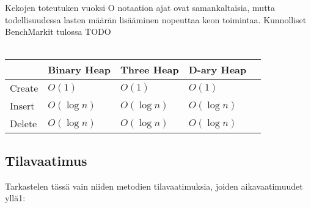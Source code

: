 \documentclass[a4paper,12pt]{article}
\begin{document}
Kekojen toteutuken vuoksi O notaation ajat ovat samankaltaisia, mutta todellisuudessa lasten määrän lisääminen nopeuttaa keon toimintaa. Kunnolliset BenchMarkit tulossa TODO\\\\
\begin{tabular}{|l|l|l|l|l|}
\hline
&Binary Heap & Three Heap & D-ary Heap \\\hline
Create & $O (1)$ & $O (1)$ & $O (1)$\\\hline
Insert & $O (\log n)$ & $O (\log n)$ & $O (\log n)$\\\hline
Delete  & $O (\log n)$ & $O (\log n)$ & $O (\log n)$\\\hline

\end{tabular}

\subsection{Tilavaatimus}
Tarkastelen tässä vain niiden metodien tilavaatimuksia, joiden aikavaatimuudet yllä1:
\end{document}
